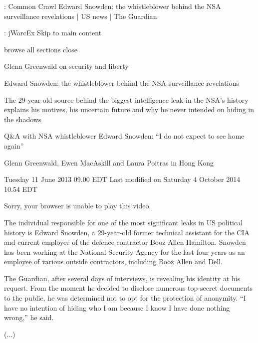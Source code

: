\documentclass[12pt, utf8, ngerman]{beamer}
\begin{document}
\begin{frame}{\insertsection: Common Crawl}
    \scriptsize
    Edward Snowden: the whistleblower behind the NSA surveillance revelations $|$ US news $|$ The Guardian
\end{frame}

\begin{frame}{\insertsection: jWarcEx}
    \scriptsize
    Skip to main content

    browse all sections close

    Glenn Greenwald on security and liberty

    Edward Snowden: the whistleblower behind the NSA surveillance revelations

    The 29-year-old source behind the biggest intelligence leak in the NSA's history explains his motives, his uncertain future and why he never intended on hiding in the shadows

    Q\&A with NSA whistleblower Edward Snowden: ``I do not expect to see home again''

    Glenn Greenwald, Ewen MacAskill and Laura Poitras in Hong Kong

    Tuesday 11 June 2013 09.00 EDT Last modified on Saturday 4 October 2014 10.54 EDT

    Sorry, your browser is unable to play this video.

    The individual responsible for one of the most significant leaks in US political history is Edward Snowden, a 29-year-old former technical assistant for the CIA and current employee of the defence contractor Booz Allen Hamilton. Snowden has been working at the National Security Agency for the last four years as an employee of various outside contractors, including Booz Allen and Dell.

    The Guardian, after several days of interviews, is revealing his identity at his request. From the moment he decided to disclose numerous top-secret documents to the public, he was determined not to opt for the protection of anonymity. ``I have no intention of hiding who I am because I know I have done nothing wrong,'' he said.

    (...)
\end{frame}
\end{document}
